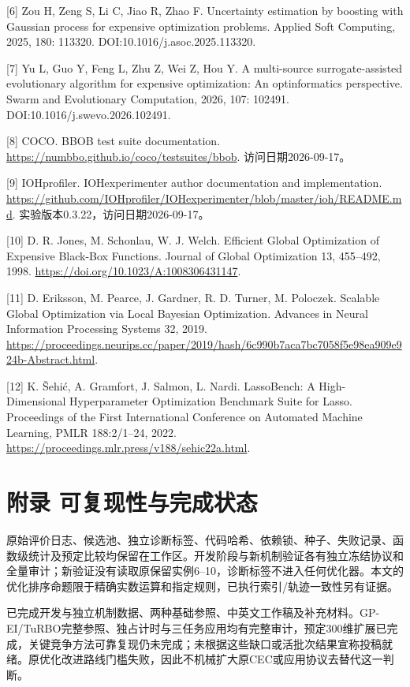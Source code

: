 \documentclass[11pt,a4paper]{article}
\begin{document}
{[}6{]} Zou H, Zeng S, Li C, Jiao R, Zhao F. Uncertainty estimation by
boosting with Gaussian process for expensive optimization problems.
Applied Soft Computing, 2025, 180: 113320.
DOI:10.1016/j.asoc.2025.113320.

{[}7{]} Yu L, Guo Y, Feng L, Zhu Z, Wei Z, Hou Y. A multi-source
surrogate-assisted evolutionary algorithm for expensive optimization: An
optinformatics perspective. Swarm and Evolutionary Computation, 2026,
107: 102491. DOI:10.1016/j.swevo.2026.102491.

{[}8{]} COCO. BBOB test suite documentation.
\url{https://numbbo.github.io/coco/testsuites/bbob}.
访问日期2026-09-17。

{[}9{]} IOHprofiler. IOHexperimenter author documentation and
implementation.
\url{https://github.com/IOHprofiler/IOHexperimenter/blob/master/ioh/README.md}.
实验版本0.3.22，访问日期2026-09-17。

{[}10{]} D. R. Jones, M. Schonlau, W. J. Welch. Efficient Global
Optimization of Expensive Black-Box Functions. Journal of Global
Optimization 13, 455--492, 1998.
\url{https://doi.org/10.1023/A:1008306431147}.

{[}11{]} D. Eriksson, M. Pearce, J. Gardner, R. D. Turner, M. Poloczek.
Scalable Global Optimization via Local Bayesian Optimization. Advances
in Neural Information Processing Systems 32, 2019.
\url{https://proceedings.neurips.cc/paper/2019/hash/6c990b7aca7bc7058f5e98ea909e924b-Abstract.html}.

{[}12{]} K. Šehić, A. Gramfort, J. Salmon, L. Nardi. LassoBench: A
High-Dimensional Hyperparameter Optimization Benchmark Suite for Lasso.
Proceedings of the First International Conference on Automated Machine
Learning, PMLR 188:2/1--24, 2022.
\url{https://proceedings.mlr.press/v188/sehic22a.html}.

\hypertarget{ux9644ux5f55-ux53efux590dux73b0ux6027ux4e0eux5b8cux6210ux72b6ux6001}{%
\section{附录
可复现性与完成状态}\label{ux9644ux5f55-ux53efux590dux73b0ux6027ux4e0eux5b8cux6210ux72b6ux6001}}

原始评价日志、候选池、独立诊断标签、代码哈希、依赖锁、种子、失败记录、函数级统计及预定比较均保留在工作区。开发阶段与新机制验证各有独立冻结协议和全量审计；新验证没有读取原保留实例6--10，诊断标签不进入任何优化器。本文的优化排序命题限于精确实数运算和指定规则，已执行索引/轨迹一致性另有证据。

已完成开发与独立机制数据、两种基础参照、中英文工作稿及补充材料。GP-EI/TuRBO完整参照、独占计时与三任务应用均有完整审计，预定300维扩展已完成，关键竞争方法可靠复现仍未完成；未根据这些缺口或活批次结果宣称投稿就绪。原优化改进路线门槛失败，因此不机械扩大原CEC或应用协议去替代这一判断。
\end{document}
